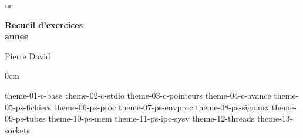 \documentclass  {report}
\newcommand {\tassertoc} {{ \setlength {\parskip} {0cm} \tableofcontents }}
\newcommand {\marquerchapitre} [1]
    {
        \addcontentsline {toc} {chapter} {#1}
        \markboth {#1} {#1}
    }
\newcommand {\chapitresanstitre} [1]
    {
        \cleardoublepage
	\marquerchapitre {#1}
    }
\newcommand {\titrechapitre} [1]
    {
	\begin {center}
	    \Large \bf #1
	\end {center}
	\bigskip
	\bigskip
    }
\newcommand {\chapitre} [1]
    {
        \chapitresanstitre {#1}
        \titrechapitre {#1}
    }
\newcounter {td}
\newcounter {tp}
\newcounter {exercice} [tp]
\begin{document}
\thispagestyle {empty}

\begin {titlepage}
     {ue}

    \vfill

    \begin {center}
	\huge\bf
	Recueil d'exercices \\
	\vspace* {5mm}
	 {annee}
    \end {center}

    \vfill

    \begin {flushright}
	Pierre David
    \end {flushright}
\end {titlepage}

\cleardoublepage
\tassertoc


% 
% 
% 
% 
% 
% 
% 


 {theme-01-c-base}
 {theme-02-c-stdio}
 {theme-03-c-pointeurs}
 {theme-04-c-avance}
 {theme-05-ps-fichiers}
 {theme-06-ps-proc}
 {theme-07-ps-envproc}
 {theme-08-ps-signaux}
 {theme-09-ps-tubes}
 {theme-10-ps-mem}
 {theme-11-ps-ipc-sysv}
 {theme-12-threads}
 {theme-13-sockets}
\end{document}
